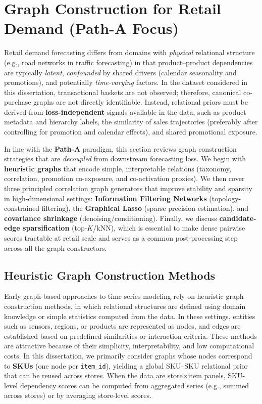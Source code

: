 \section{Graph Construction for Retail Demand (Path-A Focus)}
\label{sec:sota-graph-construction}

Retail demand forecasting differs from domains with \emph{physical} relational structure (e.g., road networks in
traffic forecasting) in that product--product dependencies are typically \emph{latent}, \emph{confounded} by shared
drivers (calendar seasonality and promotions), and potentially \emph{time-varying} factors. In the dataset considered in this dissertation, transactional baskets are not observed; therefore, canonical co-purchase graphs are not directly
identifiable. Instead, relational priors must be derived from \textbf{loss-independent} signals available in the data, such as product metadata and hierarchy labels, the similarity of sales trajectories (preferably after controlling for promotion and calendar effects), and shared promotional exposure.

In line with the \textbf{Path-A} paradigm, this section reviews graph construction strategies that are \emph{decoupled}
from downstream forecasting loss. We begin with \textbf{heuristic graphs} that encode simple, interpretable
relations (taxonomy, correlation, promotion co-exposure, and co-activation proxies). We then cover three principled
correlation graph generators that improve stability and sparsity in high-dimensional settings: \textbf{Information Filtering Networks} (topology-constrained filtering), the \textbf{Graphical Lasso} (sparse precision estimation), and
\textbf{covariance shrinkage} (denoising/conditioning). Finally, we discuss \textbf{candidate-edge sparsification} (top-$K$/kNN), which is essential to make dense pairwise scores tractable at retail scale and serves as a common
post-processing step across all the graph constructors.

\subsection{Heuristic Graph Construction Methods}
\label{sec:heuristic_graphs}

Early graph-based approaches to time series modeling rely on heuristic graph construction methods,
in which relational structures are defined using domain knowledge or simple statistics computed
from the data. In these settings, entities such as sensors, regions, or products are represented as
nodes, and edges are established based on predefined similarities or interaction criteria. These methods
are attractive because of their simplicity, interpretability, and low computational costs. In this dissertation, we primarily consider graphs whose nodes correspond to \textbf{SKUs} (one node per \texttt{item\_id}), yielding a global SKU--SKU relational prior that can be reused across stores. When the data are store$\times$item panels, SKU-level dependency scores can be computed from aggregated series (e.g., summed across stores) or by averaging store-level scores.

